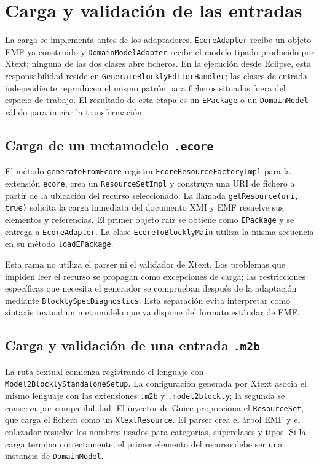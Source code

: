 \section{Carga y validación de las entradas}
\label{sec:carga-validacion-entradas}

La carga se implementa antes de los adaptadores. \texttt{EcoreAdapter} recibe un
objeto EMF ya construido y \texttt{DomainModelAdapter} recibe el modelo tipado
producido por Xtext; ninguna de las dos clases abre ficheros. En la ejecución
desde Eclipse, esta responsabilidad reside en
\texttt{GenerateBlocklyEditorHandler}; las clases de entrada independiente reproducen el mismo
patrón para ficheros situados fuera del espacio de trabajo. El resultado de esta etapa es
un \texttt{EPackage} o un \texttt{DomainModel} válido para iniciar la
transformación.

\subsection{Carga de un metamodelo \texttt{.ecore}}

El método \texttt{generateFromEcore} registra
\texttt{EcoreResourceFactoryImpl} para la extensión \texttt{ecore}, crea un
\texttt{ResourceSetImpl} y construye una URI de fichero a partir de la ubicación
del recurso seleccionado. La llamada \texttt{getResource(uri, true)} solicita la
carga inmediata del documento XMI y EMF resuelve sus elementos y referencias. El
primer objeto raíz se obtiene como \texttt{EPackage} y se entrega a
\texttt{EcoreAdapter}. La clase \texttt{EcoreToBlocklyMain} utiliza la misma
secuencia en su método \texttt{loadEPackage}.

Esta rama no utiliza el parser ni el validador de Xtext. Los problemas que
impiden leer el recurso se propagan como excepciones de carga; las restricciones
específicas que necesita el generador se comprueban después de la adaptación
mediante \texttt{BlocklySpecDiagnostics}. Esta separación evita interpretar
como sintaxis textual un metamodelo que ya dispone del formato estándar de EMF.

\subsection{Carga y validación de una entrada \texttt{.m2b}}

La ruta textual comienza registrando el lenguaje con
\texttt{Model2BlocklyStandalone}\allowbreak\texttt{Setup}. La configuración generada por Xtext
asocia el mismo lenguaje con las extensiones \texttt{.m2b} y
\texttt{.model2blockly}; la segunda se conserva por compatibilidad. El inyector
de Guice proporciona el \texttt{ResourceSet}, que carga el fichero como un
\texttt{XtextResource}. El parser crea el árbol EMF y el enlazador resuelve los
nombres usados para categorías, superclases y tipos. Si la carga termina
correctamente, el primer elemento del recurso debe ser una instancia de
\texttt{DomainModel}.


